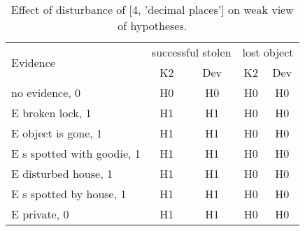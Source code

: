 \begin{table}\begin{tabular}{l|cc|cc}\toprule\multirow{2}{*}{Evidence} & \multicolumn{2}{c}{successful stolen}& \multicolumn{2}{c}{lost object}\\& {K2} & {Dev}& {K2} & {Dev}\\\midrule
no evidence, 0 & H0&H0&H0&H0\\E broken lock, 1 & H1&H1&H0&H0\\E object is gone, 1 & H1&H1&H0&H0\\E s spotted with goodie, 1 & H1&H1&H0&H0\\E disturbed house, 1 & H1&H1&H0&H0\\E s spotted by house, 1 & H1&H1&H0&H0\\E private, 0 & H1&H1&H0&H0\\\bottomrule\end{tabular}\caption{Effect of disturbance of [4, 'decimal places'] on weak view of hypotheses.}\end{table}